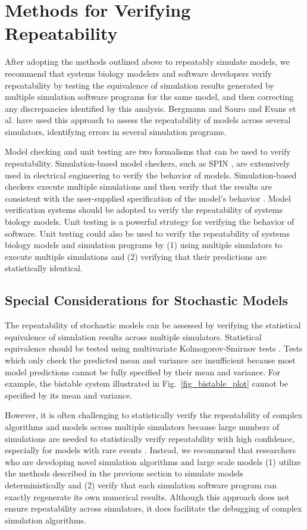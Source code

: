 \documentclass[journal,transmag,twoside]{IEEEtran}
\begin{document}
\section{Methods for Verifying Repeatability} \label{validationSection}
After adopting the methods outlined above to repeatably simulate models, we recommend that systems biology modelers and software developers verify repeatability by testing the equivalence of simulation results generated by multiple simulation software programs for the same model, and then correcting any discrepancies identified by this analysis. Bergmann and Sauro \cite{bergmann2008comparing} and Evans et al. \cite{evans2008sbml} have used this approach to assess the repeatability of models across several simulators, identifying errors in several simulation programs.

Model checking and unit testing are two formalisms that can be used to verify repeatability. Simulation-based model checkers, such as SPIN \cite{holzmann1997model}, are extensively used in electrical engineering to verify the behavior of models. Simulation-based checkers execute multiple simulations and then verify that the results are consistent with the user-supplied specification of the model's behavior \cite{kwiatkowska2011prism}. Model verification systems should be adopted to verify the repeatability of systems biology models. Unit testing is a powerful strategy for verifying the behavior of software. Unit testing could also be used to verify the repeatability of systems biology models and simulation programs by (1) using multiple simulators to execute multiple simulations and (2) verifying that their predictions are statistically identical.

\subsection{Special Considerations for Stochastic Models}
The repeatability of stochastic models can be assessed by verifying the statistical equivalence of simulation results across multiple simulators. Statistical equivalence should be tested using multivariate Kolmogorov-Smirnov tests \cite{justel1997multivariate}. Tests which only check the predicted mean and variance are insufficient because most model predictions cannot be fully specified by their mean and variance. For example, the bistable system illustrated in Fig.~\ref{fig_bistable_plot} cannot be specified by its mean and variance. 

However, it is often challenging to statistically verify the repeatability of complex algorithms and models across multiple simulators because large numbers of simulations are needed to statistically verify repeatability with high confidence, especially for models with rare events \cite{kim2013nonlinear}. Instead, we recommend that researchers who are developing novel simulation algorithms and large scale models (1) utilize the methods described in the previous section to simulate models deterministically and (2) verify that each simulation software program can exactly regenerate its own numerical results. Although this approach does not ensure repeatability across simulators,  it does facilitate the debugging of complex simulation algorithms.
\end{document}
